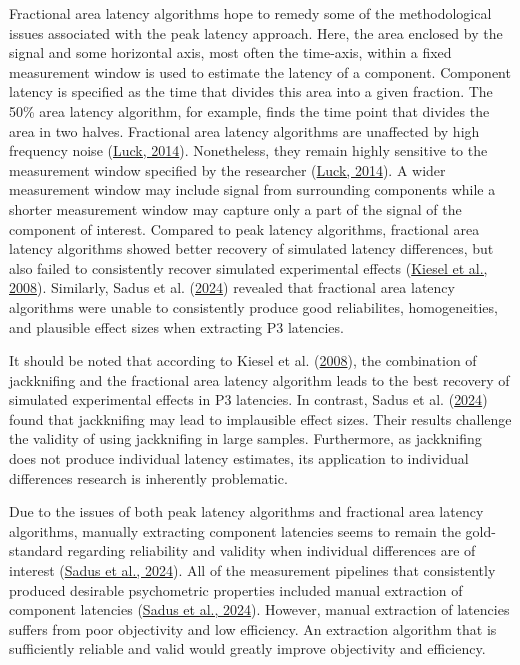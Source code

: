 \documentclass[
  man]{apa7}
\begin{document}
Fractional area latency algorithms hope to remedy some of the methodological issues associated with the peak latency approach. Here, the area enclosed by the signal and some horizontal axis, most often the time-axis, within a fixed measurement window is used to estimate the latency of a component. Component latency is specified as the time that divides this area into a given fraction. The 50\% area latency algorithm, for example, finds the time point that divides the area in two halves. Fractional area latency algorithms are unaffected by high frequency noise (\protect\hyperlink{ref-luck2014introduction}{Luck, 2014}). Nonetheless, they remain highly sensitive to the measurement window specified by the researcher (\protect\hyperlink{ref-luck2014introduction}{Luck, 2014}). A wider measurement window may include signal from surrounding components while a shorter measurement window may capture only a part of the signal of the component of interest. Compared to peak latency algorithms, fractional area latency algorithms showed better recovery of simulated latency differences, but also failed to consistently recover simulated experimental effects (\protect\hyperlink{ref-kiesel2008measurement}{Kiesel et al., 2008}). Similarly, Sadus et al. (\protect\hyperlink{ref-sadus2024explorative}{2024}) revealed that fractional area latency algorithms were unable to consistently produce good reliabilites, homogeneities, and plausible effect sizes when extracting P3 latencies.

It should be noted that according to Kiesel et al. (\protect\hyperlink{ref-kiesel2008measurement}{2008}), the combination of jackknifing and the fractional area latency algorithm leads to the best recovery of simulated experimental effects in P3 latencies. In contrast, Sadus et al. (\protect\hyperlink{ref-sadus2024explorative}{2024}) found that jackknifing may lead to implausible effect sizes. Their results challenge the validity of using jackknifing in large samples. Furthermore, as jackknifing does not produce individual latency estimates, its application to individual differences research is inherently problematic.

Due to the issues of both peak latency algorithms and fractional area latency algorithms, manually extracting component latencies seems to remain the gold-standard regarding reliability and validity when individual differences are of interest (\protect\hyperlink{ref-sadus2024explorative}{Sadus et al., 2024}). All of the measurement pipelines that consistently produced desirable psychometric properties included manual extraction of component latencies (\protect\hyperlink{ref-sadus2024explorative}{Sadus et al., 2024}). However, manual extraction of latencies suffers from poor objectivity and low efficiency. An extraction algorithm that is sufficiently reliable and valid would greatly improve objectivity and efficiency.
\end{document}
